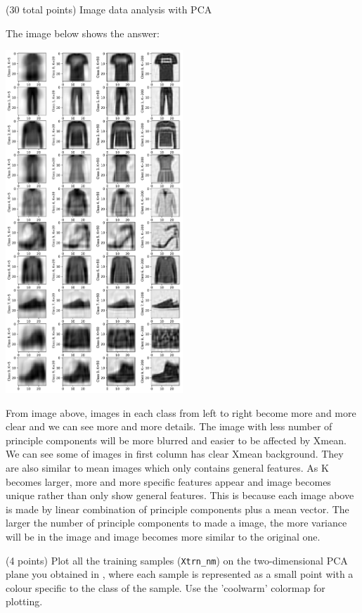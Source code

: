 \documentclass[12pt]{article}
\begin{document}
\begin{question}{(30 total points) Image data analysis with PCA}
\begin{subquestion}
      \begin{answerbox}{52em}
         The image below shows the answer:
         \begin{center}
         \includegraphics[width=0.5\textwidth]{PCA3.pdf}
         \end{center}
         From image above, images in each class from left to right become more and more clear and we can see more and more details. The image with less number of principle components will be more blurred and easier to be affected by Xmean. We can see some of images in first column has clear Xmean background. They are also similar to mean images which only contains general features. As K becomes larger, more and more specific features appear and image becomes unique rather than only show general features. This is because each image above is made by linear combination of principle components plus a mean vector. The larger the number of principle components to made a image, the more variance will be in the image and image becomes more similar to the original one.
      \end{answerbox}
  


   \end{subquestion}
   \begin{subquestion}{(4 points)
       Plot all the training samples (\texttt{Xtrn\_nm}) on the
       two-dimensional PCA plane you obtained in , where each sample is
       represented as a small point with a colour specific to the class of
       the sample.  Use the 'coolwarm' colormap for plotting.
     } \label{Q1.8}



\end{subquestion}
\end{question}
\end{document}
